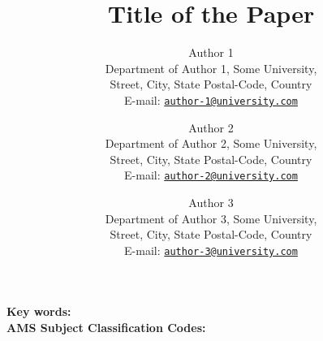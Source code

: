 

\setlength{\droptitle}{-15em}



	\title{Title of the Paper}
	\author{
		Author 1\\
		\small{Department of Author 1, Some University,}\\\small{Street, City, State Postal-Code, Country}\\
		\small E-mail: \href{mailto:author-1@university.com}{\texttt{author-1@university.com}}
		\and
		Author 2\\
		\small{Department of Author 2, Some University,}\\\small{Street, City, State Postal-Code, Country}\\
		\small E-mail: \href{mailto:author-2@university.com}{\texttt{author-2@university.com}}
		\and
		Author 3\\
		\small{Department of Author 3, Some University,}\\\small{Street, City, State Postal-Code, Country}\\
		\small E-mail: \href{mailto:author-3@university.com}{\texttt{author-3@university.com}}
	}
	\newpage
	\begin{titlingpage}
		\maketitle
		\indent\indent\small\textbf{Key words:}\,\\
		\indent\indent\small\textbf{AMS Subject Classification Codes:}\,
		\begin{abstract}
			
		\end{abstract}
	\end{titlingpage}
	\newpage
	
% 	
%   	
    \newpage
    

